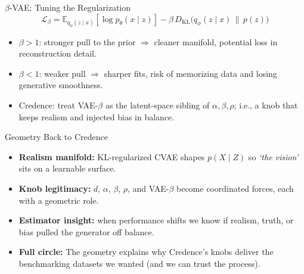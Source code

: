 \documentclass[aspectratio=169]{beamer}
\begin{document}
\begin{frame}{$\beta$-VAE: Tuning the Regularization}
  \small
  \begin{equation*}
    \mathcal L_\beta = \mathbb E_{q_\phi(z\mid x)}[\log p_\theta(x\mid z)] - \beta\, D_{\mathrm{KL}}\!\big(q_\phi(z\mid x)\,\|\,p(z)\big)
  \end{equation*}
  \vspace{0.4em}
  \begin{itemize}
    \item $\beta > 1$: stronger pull to the prior $\Rightarrow$ cleaner manifold, potential loss in reconstruction detail.
    \item $\beta < 1$: weaker pull $\Rightarrow$ sharper fits, risk of memorizing data and losing generative smoothness.
    \item Credence: treat VAE-$\beta$ as the latent-space sibling of $\alpha,\beta,\rho$; i.e., a knob that keeps realism and injected bias in balance.
  \end{itemize}
\end{frame}

\begin{frame}{Geometry Back to Credence}
  \small
  \begin{itemize}
    \item \textbf{Realism manifold:} KL-regularized CVAE shapes $p(X\mid Z)$ so \emph{`the vision'} sits on a learnable surface.
    \item \textbf{Knob legitimacy:} $d$, $\alpha$, $\beta$, $\rho$, and VAE-$\beta$ become coordinated forces, each with a geometric role.
    \item \textbf{Estimator insight:} when performance shifts we know if realism, truth, or bias pulled the generator off balance.
    \item \textbf{Full circle:} The geometry explains why Credence's knobs deliver the benchmarking datasets we wanted (and we can trust the process).
  \end{itemize}
\end{frame}
\end{document}
